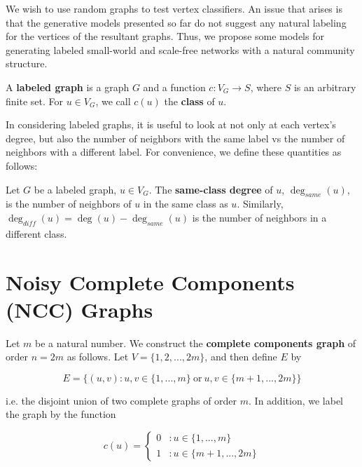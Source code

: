 We wish to use random graphs to test vertex classifiers. An issue that arises is that the generative
models presented so far do not suggest any natural labeling for the vertices of the resultant graphs.
Thus, we propose some models for generating labeled small-world and scale-free networks with a natural community structure.

\begin{definition}
  A \textbf{labeled graph} is a graph $G$ and a function $c : V_G \to S$, where $S$ is an arbitrary
  finite set. For $u \in V_G$, we call $c(u)$ the \textbf{class} of $u$.
\end{definition}

In considering labeled graphs, it is useful to look at not only at each vertex's degree, but also the
number of neighbors with the same label vs the number of neighbors with a different label. For
convenience, we define these quantities as follows:

\begin{definition}
  Let $G$ be a labeled graph, $u \in V_G$. The \textbf{same-class degree} of $u$,
  $\deg_{\textit{same}}(u)$, is the number of neighbors of $u$ in the same class as $u$. Similarly,
  $\deg_{\textit{diff}}(u) = \deg(u) - \deg_{\textit{same}}(u)$ is the number of neighbors in a
  different class.
\end{definition}


\section{Noisy Complete Components (NCC) Graphs}

\begin{definition}
  Let $m$ be a natural number. We construct the \textbf{complete components
    graph} of order $n = 2m$ as follows. Let $V = \{1,2, ..., 2m\}$, and then define
  $E$ by

  \[
    E = \{ (u,v) : u,v \in \{1,...,m\} ~\text{or}~ u,v \in \{m+1,...,2m\} \}
  \]

  i.e. the disjoint union of two complete graphs of order $m$. In addition, we label the graph by the
  function

  \[c(u) =
      \begin{cases}
        0 &: u \in \{1,...,m\} \\
        1 &: u \in \{m+1,...,2m\}
      \end{cases}
    \]
\end{definition}

